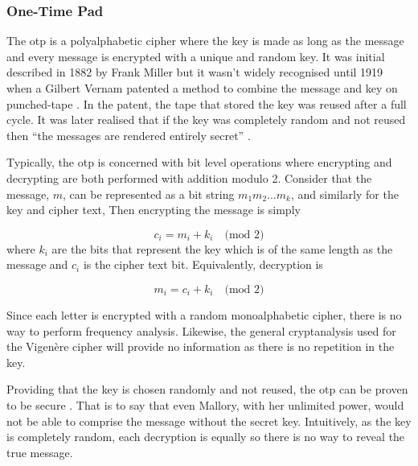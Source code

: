 \subsubsection*{One-Time Pad}


The \ac{otp} is a polyalphabetic cipher where the key is made as long as the message and every message is encrypted with a unique and random key. It was initial described in 1882 by Frank Miller \cite{miller1882telegraphic} but it wasn't widely recognised until 1919 when a Gilbert Vernam patented a method to combine the message and key on punched-tape \cite{vernam1919}. In the patent, the tape that stored the key was reused after a full cycle. It was later realised that if the key was completely random and not reused then ``the messages are rendered entirely secret'' \cite{vernam1926cipher}. 

Typically, the \ac{otp} is concerned with bit level operations where encrypting and decrypting are both performed with addition modulo 2. Consider that the message, $m$, can be represented as a bit string $m_1m_2\ldots m_k$, and similarly for the key and cipher text, Then encrypting the message is simply

\begin{equation}
	c_i = m_i + k_i\quad\text{(mod 2)} 
\end{equation}
where $k_i$ are the bits that represent the key which is of the same length as the message and $c_i$ is the cipher text bit. Equivalently, decryption is

\begin{equation}
	m_i = c_i + k_i\quad\text{(mod 2)}
\end{equation}

Since each letter is encrypted with a random monoalphabetic cipher, there is no way to perform frequency analysis. Likewise, the general cryptanalysis used for the Vigen\`{e}re cipher will provide no information as there is no repetition in the key.

Providing that the key is chosen randomly and not reused, the \ac{otp} can be proven to be  secure \cite{shannon1949communication}. That is to say that even Mallory, with her unlimited power, would not be able to comprise the message without the secret key. Intuitively, as the key is completely random, each decryption is equally so there is no way to reveal the true message.

